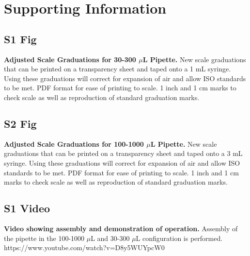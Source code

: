 \documentclass[10pt,letterpaper]{article}
\begin{document}
\section*{Supporting Information}

\subsection*{S1 Fig}
\label{S1_Fig}
{\bf Adjusted Scale Graduations for 30-300 $\mu$L Pipette.} New scale graduations that can be printed on a transparency sheet and taped onto a 1 mL syringe. Using these graduations will correct for expansion of air and allow ISO standards to be met. PDF format for ease of printing to scale. 1 inch and 1 cm marks to check scale as well as reproduction of standard graduation marks.

\subsection*{S2 Fig}
\label{S2_Fig}
{\bf Adjusted Scale Graduations for 100-1000 $\mu$L Pipette.} New scale graduations that can be printed on a transparency sheet and taped onto a 3 mL syringe. Using these graduations will correct for expansion of air and allow ISO standards to be met. PDF format for ease of printing to scale. 1 inch and 1 cm marks to check scale as well as reproduction of standard graduation marks.

\subsection*{S1 Video}
\label{S1_Video}
{\bf Video showing assembly and demonstration of operation.} Assembly of the pipette in the 100-1000 $\mu$L and 30-300 $\mu$L configuration is performed. https://www.youtube.com/watch?v=D8y5WUYpcW0

\nolinenumbers



\end{document}

